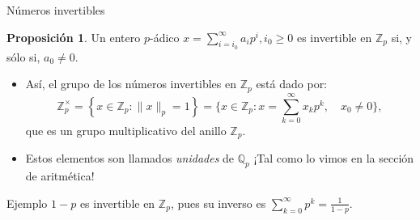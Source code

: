 \documentclass{beamer}
\theoremstyle{definition}
\numberwithin{equation}{section}
\newcommand{\orangee}[1]{\textcolor{thColor}{#1}}
\newtheorem{pr}{\orangee{Proposición}}
\newcommand{\tit}[1]{\textit{#1}}
\renewcommand{\geq}{\geqslant}
\newcommand{\Qp}{\mathbb{Q}_p}
\newcommand{\Zp}{\mathbb{Z}_p}
\newcommand{\pnorm}[1]{\|#1\|_p}
\begin{document}
\begin{frame}{Números invertibles}
\begin{pr}
	Un entero $p$-ádico $x=\sum_{i=i_{0}}^{\infty}a_{i}p^{i},i_{0}\geq0$ es invertible en $\Zp$ si, y sólo si, $a_0\neq 0$.
\end{pr}
\begin{itemize}
	\item Así, el grupo de los números invertibles en $\Zp$ está dado por:
	$$
	\mathbb{Z}_{p}^{\times}=\left\{x \in \mathbb{Z}_{p}:\pnorm{x}=1\right\}=\Big\{x \in \mathbb{Z}_{p}: x=\sum_{k=0}^{\infty} x_{k} p^{k}, \quad x_{0} \neq 0\Big\},$$
	que es un grupo multiplicativo del anillo $\Zp$.
	\item Estos elementos son llamados \tit{unidades} de $\Qp$ ¡Tal como lo vimos en la sección de aritmética!
\end{itemize}
\begin{exampleblock}{Ejemplo}
	$1-p$ es invertible en $\Zp$, pues su inverso es $\sum_{k=0}^{\infty}p^k=\frac{1}{1-p}.$
\end{exampleblock}
\end{frame}
\end{document}
